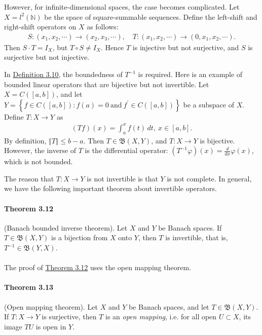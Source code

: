\documentclass{article}
\begin{document}
However, for infinite-dimensional spaces, the case becomes complicated. Let $X=l^2(\mathbb{N})$ be the space of square-summable sequences. Define the left-shift and right-shift operators on $X$ as follows:
\begin{align*}
	S:(x_1,x_2,\cdots)\to (x_2,x_3,\cdots),\quad 
	T:(x_1,x_2,\cdots)\to (0,x_1,x_2,\cdots).
\end{align*}
Then $S\cdot T=I_X$, but $T\circ S\neq I_X$. Hence $T$ is injective but not surjective, and $S$ is surjective but not injective.\vspace{0.1cm}

In \hyperref[def:3.10]{Definition 3.10}, the boundedness of $T^{-1}$ is required. Here is an example of bounded linear operators that are bijective but not invertible. Let $X=C([a,b])$, and let $Y=\left\{f\in C([a,b]):f(a)=0\ \text{and}\ f^\prime\in C([a,b])\right\}$ be a subspace of $X$. Define $T:X\to Y$ as
\begin{align*}
	(Tf)(x) = \int_a^x f(t)\,dt,\ x\in [a,b].
\end{align*}
By definition, $\Vert T\Vert\leq b-a$. Then $T\in\mathfrak{B}(X,Y)$, and $T:X\to Y$ is bijective. However, the inverse of $T$ is the differential operator: $(T^{-1}\varphi)(x)=\frac{d}{dx}\varphi(x)$, which is not bounded.
\vspace{0.1cm}

The reason that $T:X\to Y$ is not invertible is that $Y$ is not complete. In general, we have the following important theorem about invertible operators.

\paragraph{Theorem 3.12\label{thm:3.12}} (Banach bounded inverse theorem). Let $X$ and $Y$ be Banach spaces. If $T\in\mathfrak{B}(X,Y)$ is a bijection from $X$ onto $Y$, then $T$ is invertible, that is, $T^{-1}\in\mathfrak{B}(Y,X)$.

\paragraph{} The proof of \hyperref[thm:3.12]{Theorem 3.12} uses the open mapping theorem.

\paragraph{Theorem 3.13\label{thm:3.13}} (Open mapping theorem). Let $X$ and $Y$ be Banach spaces, and let $T\in\mathfrak{B}(X,Y)$. If $T:X\to Y$ is surjective, then $T$ is an \textit{open mapping}, i.e. for all open $U\subset X$, its image $TU$ is open in $Y$.
\end{document}

